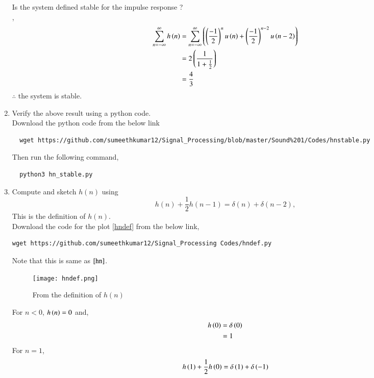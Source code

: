 \documentclass[journal,12pt,twocolumn]{IEEEtran}
\renewcommand\thesection{\arabic{section}}
\begin{document}
\begin{enumerate}[label=\thesection.\arabic*]
        Is the system defined  stable for the impulse response ?\\
    \solution ,
      \begin{align}
        \sum_{n=-\infty}^{\infty}h\left(n\right) &= \sum_{n=-\infty}^{\infty}\left(\left(\frac{-1}{2}\right)^{n} u\left(n\right) + \left(\frac{-1}{2}\right)^{n-2} u\left(n-2\right)\right)\\
                                           &= 2\left(\frac{1}{1+\frac{1}{2}}\right)\\
                                           &= \frac{4}{3}
      \end{align}
       $\therefore$ the system is stable.  
    \item Verify the above result using a python code.\\
    \solution Download the python code from the below link 
    \begin{lstlisting}
  wget https://github.com/sumeethkumar12/Signal_Processing/blob/master/Sound%201/Codes/hnstable.py
    \end{lstlisting}
  Then run the following command,
    \begin{lstlisting}
  python3 hn_stable.py
    \end{lstlisting} 
    \item Compute and sketch $h(n)$ using 
     \begin{equation}
      h(n) + \frac{1}{2}h(n-1) = \delta(n) + \delta(n-2), 
     \end{equation}
        This is the definition of $h(n)$.\\
    \solution Download the code for the plot \ref{hndef} from the below link,
     \begin{lstlisting}
wget https://github.com/sumeethkumar12/Signal_Processing Codes/hndef.py
     \end{lstlisting}
     Note that this is same as $\ref{hn}$.\\
     \begin{figure}[ht!]
      \centering
      \texttt{[image: hndef.png]}
      \caption{From the definition of $h(n)$}
     \end{figure}
    For $n <0$, $h\left(n\right) = 0$ and,
     \begin{align} 
       h\left(0\right) &= \delta\left(0\right)\\
                 &= 1
     \end{align}
    For $n =1$,
     \begin{align} 
       h\brak{1} + \frac{1}{2}h\brak{0} &= \delta\brak{1} + \delta\brak{-1}\\

\end{align}
\end{enumerate}
\end{document}
